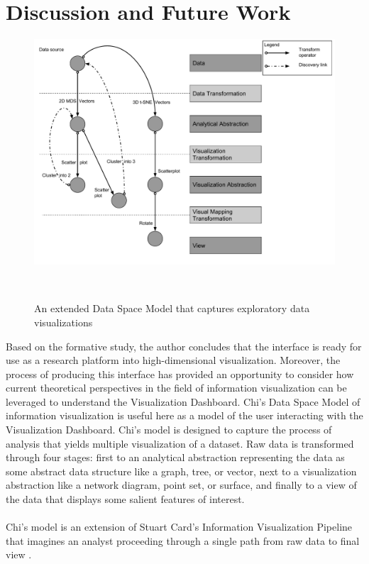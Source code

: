 \documentclass{sigchi}
\begin{document}
\section{Discussion and Future Work}%
%
\begin{figure}
  \centering
  \includegraphics[width=2\columnwidth]{figures/extended}
  \caption{An extended Data Space Model that captures exploratory data visualizations}~\label{fig:figure2}
\end{figure}
%
Based on the formative study, the author concludes that the interface is ready for use as a research platform into high-dimensional visualization.%
%
Moreover, the process of producing this interface has provided an opportunity to consider how current theoretical perspectives in the field of information visualization can be leveraged to understand the Visualization Dashboard. %
%
Chi's Data Space Model of information visualization is useful here as a model of the user interacting with the Visualization Dashboard.%
%
Chi's model is designed to capture the process of analysis that yields multiple visualization of a dataset. %
%
Raw data is transformed through four stages: first to an analytical abstraction representing the data as some abstract data structure like a graph, tree, or vector, next to a visualization abstraction like a network diagram, point set, or surface, and finally to a view of the data that displays some salient features of interest. %
%
\\\\
%
Chi's model is an extension of Stuart Card's Information Visualization Pipeline that imagines an analyst proceeding through a single path from raw data to final view \cite{chi1999framework}. %
\end{document}
